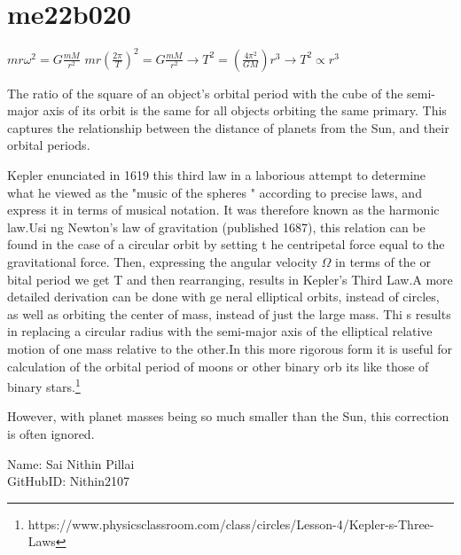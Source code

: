 \section{me22b020}
${\displaystyle mr\omega ^{2}=G{\frac {mM}{r^{2}}}}$
${\displaystyle mr\left({\frac {2\pi }{T}}\right)^{2}=G{\frac {mM}{r^{2}}}\rightarrow T^{2}=\left({\frac {4\pi ^{2}}{GM}
}\right)r^{3}\rightarrow T^{2}\propto r^{3}}$

The ratio of the square of an object's orbital period with the cube of the semi-major axis of its orbit is the same for
all objects orbiting the same primary.
This captures the relationship between the distance of planets from the Sun, and their orbital periods.

Kepler enunciated in 1619 this third law in a laborious attempt to determine what he viewed as the "music of the spheres
" according to precise laws, and express it in terms of musical notation. It was therefore known as the harmonic law.Usi
ng Newton's law of gravitation (published 1687), this relation can be found in the case of a circular orbit by setting t
he centripetal force equal to the gravitational force. Then, expressing the angular velocity $\Omega$ in terms of the or
bital period we get T and then rearranging, results in Kepler's Third Law.A more detailed derivation can be done with ge
neral elliptical orbits, instead of circles, as well as orbiting the center of mass, instead of just the large mass. Thi
s results in replacing a circular radius with the semi-major axis of the elliptical relative motion of one mass relative
 to the other.In this more rigorous form it is useful for calculation of the orbital period of moons or other binary orb
its like those of binary stars.\footnote[1]{https://www.physicsclassroom.com/class/circles/Lesson-4/Kepler-s-Three-Laws}

However, with planet masses being so much smaller than the Sun, this correction is often ignored.

\begin{flushleft}
Name: Sai Nithin Pillai\\
GitHubID: Nithin2107
\end{flushleft}
